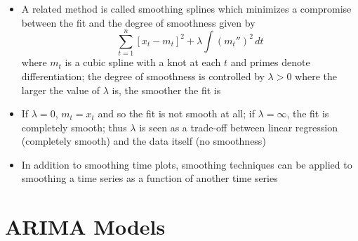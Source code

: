 \documentclass[12pt]{article}
\begin{document}
\begin{itemize}
\item A related method is called smoothing splines which minimizes a compromise between the fit and the degree of smoothness given by $$ \sum_{t=1}^n [x_t - m_t]^2 + \lambda \int (m_t'')^2 \, dt $$ where $m_t$ is a cubic spline with a knot at each $t$ and primes denote differentiation; the degree of smoothness is controlled by $\lambda > 0$ where the larger the value of $\lambda$ is, the smoother the fit is 
\item If $\lambda = 0$, $m_t = x_t$ and so the fit is not smooth at all; if $\lambda = \infty$, the fit is completely smooth; thus $\lambda$ is seen as a trade-off between linear regression (completely smooth) and the data itself (no smoothness)
\item In addition to smoothing time plots, smoothing techniques can be applied to smoothing a time series as a function of another time series 
\end{itemize} \newpage

\section{ARIMA Models}
\end{document}
